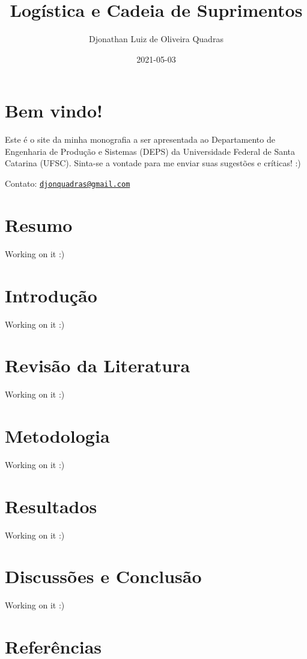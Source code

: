 \documentclass[
]{book}
\title{Logística e Cadeia de Suprimentos}
\author{Djonathan Luiz de Oliveira Quadras}
\date{2021-05-03}
\begin{document}
\maketitle

{
\setcounter{tocdepth}{1}
\tableofcontents
}
\hypertarget{bem-vindo}{%
\chapter*{Bem vindo!}\label{bem-vindo}}

Este é o site da minha monografia a ser apresentada ao Departamento de Engenharia de Produção e Sistemas (DEPS) da Universidade Federal de Santa Catarina (UFSC). Sinta-se a vontade para me enviar suas sugestões e críticas! :)

Contato: \href{mailto:djonquadras@gmail.com}{\nolinkurl{djonquadras@gmail.com}}

\hypertarget{resumo}{%
\chapter*{Resumo}\label{resumo}}

Working on it :)

\hypertarget{introduuxe7uxe3o}{%
\chapter{Introdução}\label{introduuxe7uxe3o}}

Working on it :)

\hypertarget{revisuxe3o-da-literatura}{%
\chapter{Revisão da Literatura}\label{revisuxe3o-da-literatura}}

Working on it :)

\hypertarget{metodologia}{%
\chapter{Metodologia}\label{metodologia}}

Working on it :)

\hypertarget{resultados}{%
\chapter{Resultados}\label{resultados}}

Working on it :)

\hypertarget{discussuxf5es-e-conclusuxe3o}{%
\chapter{Discussões e Conclusão}\label{discussuxf5es-e-conclusuxe3o}}

Working on it :)

\hypertarget{referuxeancias}{%
\chapter*{Referências}\label{referuxeancias}}

  
\end{document}
